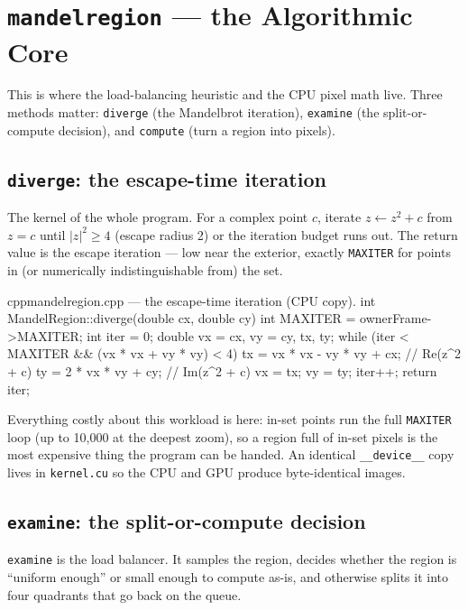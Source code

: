 \documentclass[
	english,
	letterpaper, oneside
]{article}
\begin{document}
\section{\texttt{mandelregion} --- the Algorithmic Core}

This is where the load-balancing heuristic and the CPU pixel math live. Three
methods matter: \texttt{diverge} (the Mandelbrot iteration), \texttt{examine} (the
split-or-compute decision), and \texttt{compute} (turn a region into pixels).

\subsection{\texttt{diverge}: the escape-time iteration}

The kernel of the whole program. For a complex point $c$, iterate
$z \leftarrow z^2 + c$ from $z=c$ until $|z|^2 \geq 4$ (escape radius 2) or the
iteration budget runs out. The return value is the escape iteration --- low near
the exterior, exactly \texttt{MAXITER} for points in (or numerically
indistinguishable from) the set.

\begin{sourcecode}{cpp}{mandelregion.cpp --- the escape-time iteration (CPU copy).}
int MandelRegion::diverge(double cx, double cy) {
  int MAXITER = ownerFrame->MAXITER;
  int iter = 0;
  double vx = cx, vy = cy, tx, ty;
  while (iter < MAXITER && (vx * vx + vy * vy) < 4) {
    tx = vx * vx - vy * vy + cx;     // Re(z^2 + c)
    ty = 2 * vx * vy + cy;           // Im(z^2 + c)
    vx = tx;  vy = ty;
    iter++;
  }
  return iter;
}
\end{sourcecode}

Everything costly about this workload is here: in-set points run the full
\texttt{MAXITER} loop (up to 10{,}000 at the deepest zoom), so a region full of
in-set pixels is the most expensive thing the program can be handed. An
identical \texttt{\_\_device\_\_} copy lives in \texttt{kernel.cu} so the
CPU and GPU produce byte-identical images.

\subsection{\texttt{examine}: the split-or-compute decision}

\texttt{examine} is the load balancer. It samples the region, decides whether the
region is ``uniform enough'' or small enough to compute as-is, and otherwise
splits it into four quadrants that go back on the queue.
\end{document}
